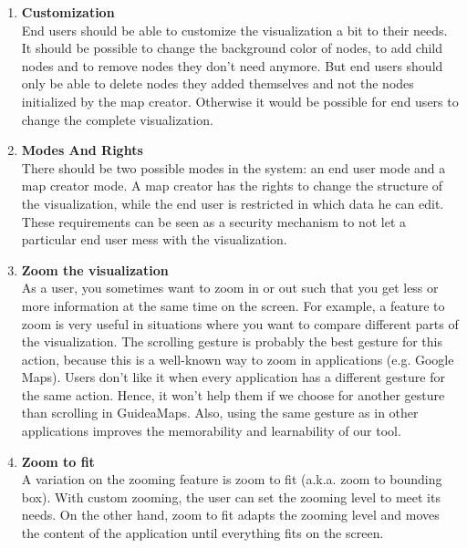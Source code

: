 \begin{enumerate}[label=\textbf{\arabic*}., ref=\arabic*]
	
	\item \textbf{Customization\label{item:customization}} \hfill \\
	End users should be able to customize the visualization a bit to their needs. It should be possible to change the background color of nodes, to add child nodes and to remove nodes they don't need anymore. But end users should only be able to delete nodes they added themselves and not the nodes initialized by the map creator. Otherwise it would be possible for end users to change the complete visualization.
  
	\item \textbf{Modes And Rights\label{item:modes-rights}} \hfill \\
	There should be two possible modes in the system: an end user mode and a map creator mode. A map creator has the rights to change the structure of the visualization, while the end user is restricted in which data he can edit. These requirements can be seen as a security mechanism to not let a particular end user mess with the visualization.
  
	\item \textbf{Zoom the visualization}\label{item:zoom} \hfill \\
	As a user, you sometimes want to zoom in or out such that you get less or more information at the same time on the screen. For example, a feature to zoom is very useful in situations where you want to compare different parts of the visualization. The scrolling gesture is probably the best gesture for this action, because this is a well-known way to zoom in applications (e.g. Google Maps). Users don't like it when every application has a different gesture for the same action. Hence, it won't help them if we choose for another gesture than scrolling in GuideaMaps. Also, using the same gesture as in other applications improves the memorability and learnability of our tool.
	
	\item \textbf{Zoom to fit\label{item:zoom-to-fit}} \hfill \\
	A variation on the zooming feature is zoom to fit (a.k.a. zoom to bounding box). With custom zooming, the user can set the zooming level to meet its needs. On the other hand, zoom to fit adapts the zooming level and moves the content of the application until everything fits on the screen.
	

\end{enumerate}
